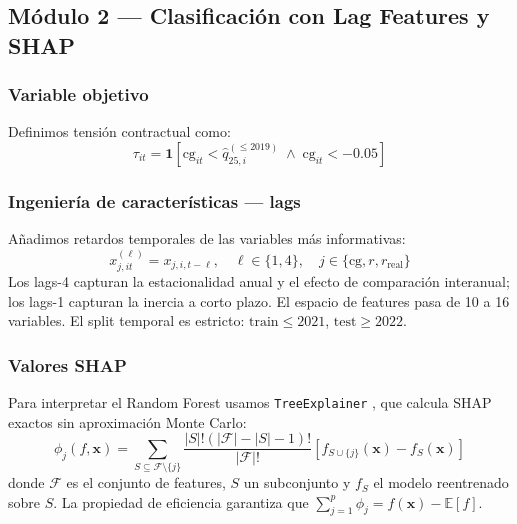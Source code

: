 \documentclass[10pt,a4paper,twocolumn]{article}
\begin{document}
\subsection{Módulo 2 — Clasificación con Lag Features y SHAP}

\subsubsection{Variable objetivo}

Definimos tensión contractual como:
\begin{equation}
  \tau_{it} = \mathbf{1}\!\left[
    \text{cg}_{it} < \hat{q}_{25,i}^{(\leq 2019)} \;\wedge\;
    \text{cg}_{it} < -0.05
  \right]
  \label{eq:tension}
\end{equation}

\subsubsection{Ingeniería de características — lags}

Añadimos retardos temporales de las variables más informativas:
\begin{equation}
  x_{j,it}^{(\ell)} = x_{j,i,t-\ell}, \quad \ell \in \{1, 4\}, \quad
  j \in \{\text{cg}, r, r_{\text{real}}\}
  \label{eq:lags}
\end{equation}
Los lags-4 capturan la estacionalidad anual y el efecto de comparación interanual;
los lags-1 capturan la inercia a corto plazo. El espacio de features pasa de 10 a 16
variables. El split temporal es estricto: $\text{train}\leq 2021$, $\text{test}\geq 2022$.

\subsubsection{Valores SHAP}

Para interpretar el Random Forest usamos \texttt{TreeExplainer} \citep{lundberg2017shap},
que calcula SHAP exactos sin aproximación Monte Carlo:
\begin{equation}
  \phi_j(f, \mathbf{x}) = \sum_{S \subseteq \mathcal{F}\setminus\{j\}}
  \frac{|S|!(|\mathcal{F}|-|S|-1)!}{|\mathcal{F}|!}
  \left[f_{S\cup\{j\}}(\mathbf{x}) - f_S(\mathbf{x})\right]
  \label{eq:shap}
\end{equation}
donde $\mathcal{F}$ es el conjunto de features, $S$ un subconjunto y $f_S$ el modelo
reentrenado sobre $S$. La propiedad de eficiencia garantiza que
$\sum_{j=1}^p \phi_j = f(\mathbf{x}) - \mathbb{E}[f]$.
\end{document}

